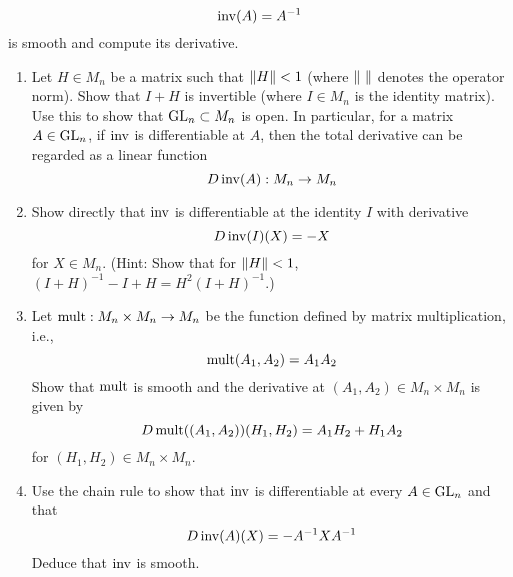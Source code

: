 \documentclass[../psets.tex]{subfiles}
\begin{document}
\begin{enumerate}
    \begin{equation*}
        \operatorname{inv}(A) = A^{-1}
    \end{equation*}
    is smooth and compute its derivative.
    \begin{enumerate}
        \item Let $H\in M_n$ be a matrix such that $\norm{H}<1$ (where $\norm{\ }$ denotes the operator norm). Show that $I+H$ is invertible (where $I\in M_n$ is the identity matrix). Use this to show that $\text{GL}_{n}\subset M_n$ is open. In particular, for a matrix $A\in\text{GL}_{n}$, if $\operatorname{inv}$ is differentiable at $A$, then the total derivative can be regarded as a linear function
        \begin{equation*}
            D\operatorname{inv}(A):M_n\to M_n
        \end{equation*}
        \item Show directly that $\operatorname{inv}$ is differentiable at the identity $I$ with derivative
        \begin{equation*}
            D\operatorname{inv}(I)(X) = -X
        \end{equation*}
        for $X\in M_n$. (Hint: Show that for $\norm{H}<1$, $(I+H)^{-1}-I+H=H^2(I+H)^{-1}$.)
        \item Let $\operatorname{mult}:M_n\times M_n\to M_n$ be the function defined by matrix multiplication, i.e.,
        \begin{equation*}
            \operatorname{mult}(A_1,A_2) = A_1A_2
        \end{equation*}
        Show that $\operatorname{mult}$ is smooth and the derivative at $(A_1,A_2)\in M_n\times M_n$ is given by
        \begin{equation*}
            D\operatorname{mult}((A_1,A_2))(H_1,H_2) = A_1H_2+H_1A_2
        \end{equation*}
        for $(H_1,H_2)\in M_n\times M_n$.
        \item Use the chain rule to show that $\operatorname{inv}$ is differentiable at every $A\in\text{GL}_{n}$ and that
        \begin{equation*}
            D\operatorname{inv}(A)(X) = -A^{-1}XA^{-1}
        \end{equation*}
        Deduce that $\operatorname{inv}$ is smooth.
    \end{enumerate}
\end{enumerate}
\end{document}
